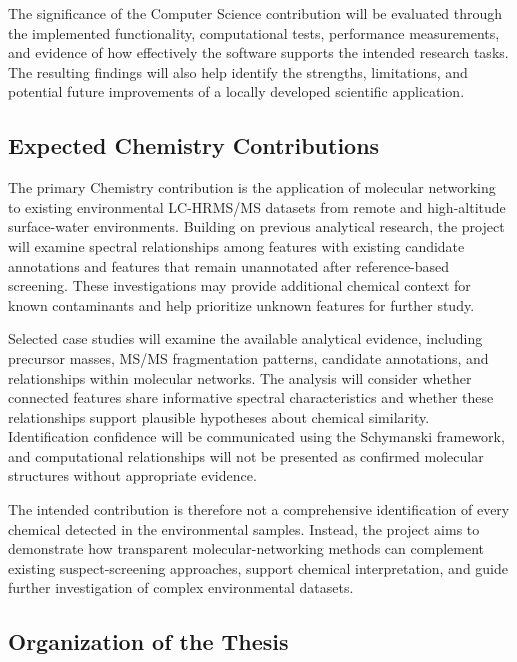        The significance of the Computer Science contribution will be evaluated through the implemented functionality, computational tests, performance measurements, and evidence of how effectively the software supports the intended research tasks. The resulting findings will also help identify the strengths, limitations, and potential future improvements of a locally developed scientific application.

    \subsection{Expected Chemistry Contributions}\label{subsec:chemistry-contributions}

        The primary Chemistry contribution is the application of molecular networking to existing environmental LC-HRMS/MS datasets from remote and high-altitude surface-water environments. Building on previous analytical research, the project will examine spectral relationships among features with existing candidate annotations and features that remain unannotated after reference-based screening. These investigations may provide additional chemical context for known contaminants and help prioritize unknown features for further study.

        Selected case studies will examine the available analytical evidence, including precursor masses, MS/MS fragmentation patterns, candidate annotations, and relationships within molecular networks. The analysis will consider whether connected features share informative spectral characteristics and whether these relationships support plausible hypotheses about chemical similarity. Identification confidence will be communicated using the Schymanski framework, and computational relationships will not be presented as confirmed molecular structures without appropriate evidence.

        The intended contribution is therefore not a comprehensive identification of every chemical detected in the environmental samples. Instead, the project aims to demonstrate how transparent molecular-networking methods can complement existing suspect-screening approaches, support chemical interpretation, and guide further investigation of complex environmental datasets.

    \subsection{Organization of the Thesis}\label{subsec:thesis-organization}

